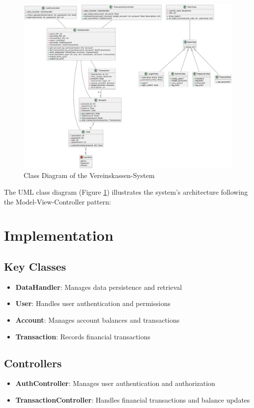 \documentclass[a4paper,11pt]{article}
\begin{document}
\begin{figure}[h]
    \centering
    \includegraphics[width=\textwidth]{uml.png}
    \caption{Class Diagram of the Vereinskassen-System}
    \label{fig:uml}
\end{figure}

The UML class diagram (Figure \ref{fig:uml}) illustrates the system's architecture following the Model-View-Controller pattern:

\section{Implementation}

\subsection{Key Classes}
\begin{itemize}
\item \textbf{DataHandler}: Manages data persistence and retrieval
\item \textbf{User}: Handles user authentication and permissions
\item \textbf{Account}: Manages account balances and transactions
\item \textbf{Transaction}: Records financial transactions
\end{itemize}

\subsection{Controllers}
\begin{itemize}
\item \textbf{AuthController}: Manages user authentication and authorization
\item \textbf{TransactionController}: Handles financial transactions and balance updates
\end{itemize}
\end{document}
